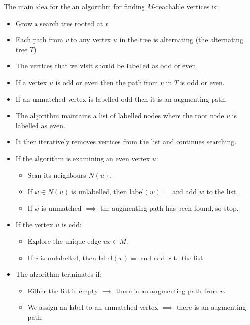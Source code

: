 The main idea for the an algorithm for finding \(M\)-reachable vertices is:
\begin{itemize}
    \item Grow a search tree rooted at \(v\).
    \item Each path from \(v\) to any vertex \(u\) in the tree is alternating (the alternating tree \(T\)).
    \item The vertices that we visit should be labelled as odd or even.
    \item If a vertex \(u\) is odd or even then the path from \(v\) in \(T\) is odd or even.
    \item If an unmatched vertex is labelled odd then it is an augmenting path.
    \item The algorithm maintains a list of labelled nodes where the root node \(v\) is labelled as even.
    \item It then iteratively removes vertices from the list and continues searching.
    \item If the algorithm is examining an even vertex \(u\):
        \begin{itemize}
            \item Scan its neighbours \(N(u)\).
            \item If \(w \in N(u)\) is unlabelled, then label\((w) = \) and add \(w\) to the list.
            \item If \(w\) is unmatched \(\implies\) the augmenting path has been found, so stop.
        \end{itemize}
    \item If the vertex \(u\) is odd:
        \begin{itemize}
            \item Explore the unique edge \(ux \in M\).
            \item If \(x\) is unlabelled, then label\((x) = \) and add \(x\) to the list.
        \end{itemize}
    \item The algorithm terminates if:
        \begin{itemize}
            \item Either the list is empty \(\implies\) there is no augmenting path from \(v\).
            \item We assign an  label to an unmatched vertex \(\implies\) there is an augmenting path.
        \end{itemize}
\end{itemize}

